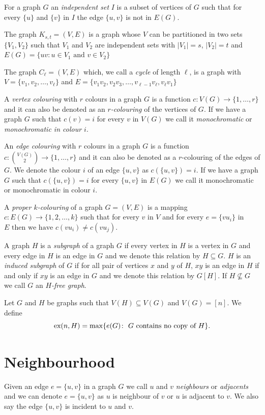 \documentclass[12pt,twoside,a4paper,bibliography=totocnumbered]{book}
\numberwithin{equation}{section}
\theoremstyle{remark}
\def\ex{\mathop{\text{\rm ex}}\nolimits}
\begin{document}
For a graph $G$ an \emph{independent set} $I$ is a subset of vertices of $G$ such that for every $\{u\}$ and $\{v\}$ in $I$ the edge $\{u,v\}$ is not in $E(G)$.

The graph $K_{s,t} = (V,E)$ is a graph whose $V$ can be partitioned in two sets $\{V_1,V_2\}$ such that $V_1$ and $V_2$ are independent sets with $|V_1| = s$, $|V_2| = t$ and $E(G) = \{uv: u \in V_1 \text{ and } v \in V_2\}$

The graph $C_{\ell} = (V,E)$ which, we call a \emph{cycle} of length $\ell$, is a graph with $V =\{v_1,v_2, \ldots, v_{\ell}\}$ and $E=\{v_1v_2,v_2v_3,\ldots, v_{\ell-1}v_{\ell},v_{\ell}v_1\}$

A \emph{ vertex colouring} with $r$ colours in a graph $G$ is a function $c\colon V(G) \rightarrow \{1,\ldots,r\}$ and it can also be denoted as an \emph{$r$-colouring} of the vertices of $G$. If we have a graph $G$ such that $c(v)=i$ for every $v$ in $V(G)$ we call it \emph{monochromatic} or \emph{monochromatic in colour $i$}.


An {\it edge colouring} with $r$ colours in a graph $G$ is a function $c\colon \binom{V(G)}{2} \rightarrow \{1,\ldots,r\}$ and it can also be denoted as a $r$-colouring of the edges of $G$. We denote the colour $i$ of an edge $\{u,v\}$ as $c(\{u,v\})=i$. If we have a graph $G$ such that $c(\{u,v\})=i$ for every $\{u,v\}$ in $E(G)$ we call it monochromatic or monochromatic in colour $i$.

A \emph{proper $k$-colouring} of a graph $G=(V,E)$ is a mapping $c\colon E(G) \rightarrow \{1,2,
\ldots,k\}$ such that for every $v$ in $V$ and for every $e =\{vu_i\}$ in $E \text{ then we have } c(vu_i) \neq c(vu_j)$.

A graph $H$ is a \emph{subgraph} of a graph $G$ if every vertex in $H$ is a vertex in $G$ and every edge in $H$ is an edge in $G$ and we denote this relation by $H \subseteq G$. $H$ is an \emph{induced subgraph} of $G$ if for all pair of vertices $x$ and $y$ of $H$, $xy$ is an edge in $H$ if and only if $xy$ is an edge in $G$ and we denote this relation by $G[H]$. If $H \nsubseteq G$ we call $G$ an \emph{$H$-free graph}.

Let $G$ and $H$ be graphs such that $V(H) \subseteq V(G)$ and $V(G)= [n]$. We define $$\ex(n,H) = \max\{e(G)\colon\text{ $G$ contains no copy of $H$}\}.$$ 

\section{Neighbourhood}
Given an edge $e =\{u,v\}$ in a graph $G$ we call $u$ and $v$ {\it neighbours} or {\it adjacents} and we can denote $e =\{u,v\}$ as $u$ is neighbour of $v$ or $u$ is adjacent to $v$. We also say the edge $\{u,v\}$ is incident to $u$ and $v$.
\end{document}
